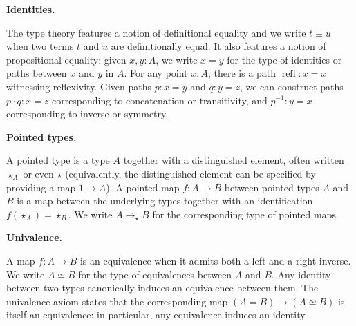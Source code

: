 \documentclass[10pt,a4paper]{article}
\begin{document}
 
 
 
\par\medskip\noindent\textbf{Identities.}\par
 
 
The type theory features a notion of definitional equality and we write $t\equiv u$ when two terms $t$ and $u$ are definitionally equal. It also features a notion of propositional equality: given $x,y:A$, we write $x=y$ for the type of identities or paths between $x$ and $y$ in $A$. For any point $x:A$, there is a path $\operatorname{refl}:x=x$ witnessing reflexivity. Given paths $p:x=y$ and $q:y=z$, we can construct paths $p\cdot q:x=z$ corresponding to concatenation or transitivity, and $p^{-1}:y=x$ corresponding to inverse or symmetry.\par
 
 
 
 
\par\medskip\noindent\textbf{Pointed types.}\par
 
 
A pointed type is a type $A$ together with a distinguished element, often written $\star_{A}$ or even $\star$ (equivalently, the distinguished element can be specified by providing a map $1\to A$). A pointed map $f:A\to B$ between pointed types $A$ and $B$ is a map between the underlying types together with an identification $f(\star_{A})=\star_{B}$. We write $A\to_{\star{}}B$ for the corresponding type of pointed maps.\par
 
 
 
 
\par\medskip\noindent\textbf{Univalence.}\par
 
 
A map $f:A\to B$ is an equivalence when it admits both a left and a right inverse. We write $A\simeq B$ for the type of equivalences between $A$ and $B$. Any identity between two types canonically induces an equivalence between them. The univalence axiom states that the corresponding map $(A=B)\to(A\simeq B)$ is itself an equivalence: in particular, any equivalence induces an identity.\par
 
\end{document}
